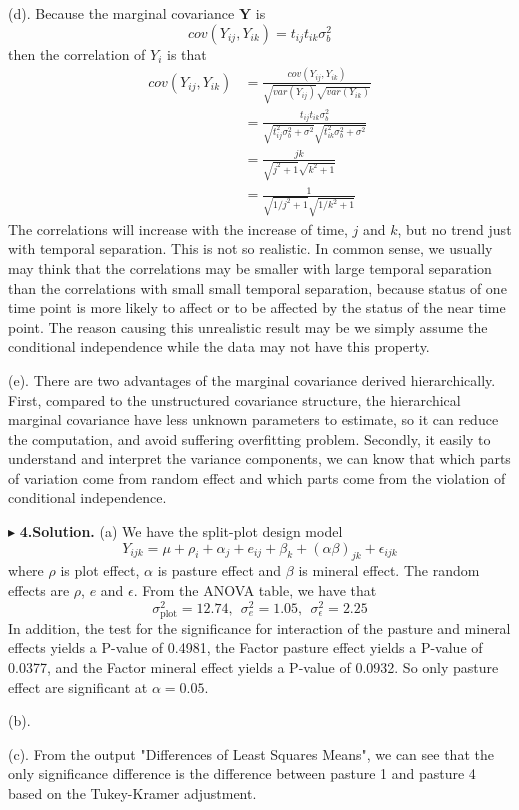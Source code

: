 \documentclass[letterpaper, 12pt]{article}
\newcommand{\ba}{$$\begin{aligned}}
\newcommand{\ea}{\end{aligned}$$}
\begin{document}
(d). Because the marginal covariance $\bm{Y}$ is
$$
cov(Y_{ij},Y_{ik})=t_{ij}t_{ik}\sigma_b^2
$$
then the correlation of $Y_i$ is that 
\ba
cov(Y_{ij},Y_{ik})&=\frac{cov(Y_{ij},Y_{ik})}{\sqrt{var(Y_{ij})}\sqrt{var(Y_{ik})}}\\
&=\frac{t_{ij}t_{ik}\sigma_b^2}{\sqrt{t_{ij}^2\sigma_b^2+\sigma^2}\sqrt{t_{ik}^2\sigma_b^2+\sigma^2}}\\
&=\frac{jk}{\sqrt{j^2+1}\sqrt{k^2+1}}\\
&=\frac{1}{\sqrt{1/j^2+1}\sqrt{1/k^2+1}}
\ea
The correlations will increase with the increase of time, $j$ and $k$, but no trend just with temporal separation. This is not so realistic. In common sense, we usually may think that the correlations may be smaller with large temporal separation than the correlations with small small temporal separation, because status of one time point is more likely to affect or to be affected by the status of the near time point. The reason causing this unrealistic result may be we simply assume the conditional independence while the data may not have this property.

(e). There are two advantages of the marginal covariance derived hierarchically. First, compared to the unstructured covariance structure, the hierarchical marginal covariance have less unknown parameters to estimate, so it can reduce the computation, and avoid suffering overfitting problem. Secondly, it easily to understand and interpret the variance components, we can know that which parts of variation come from random effect and which parts come from the violation of conditional independence.




$\blacktriangleright$ \textbf{4.\quad Solution.} 
(a) We have the split-plot design model
$$
Y_{ijk}=\mu+\rho_i+\alpha_j+e_{ij}+\beta_k+(\alpha\beta)_{jk}+\epsilon_{ijk}
$$
where $\rho$ is plot effect, $\alpha$ is pasture effect and $\beta$ is mineral effect. The random effects are $\rho$, $e$ and $\epsilon$. From the ANOVA table, we have that
$$
\sigma_{\text{plot}}^2=12.74,\ \ \sigma^2_{e}=1.05,\ \ \sigma_\epsilon^2=2.25
$$
In addition, the test for the significance for interaction of the pasture and mineral effects yields a P-value of 0.4981, the Factor pasture effect yields a P-value of 0.0377, and the Factor mineral effect yields a P-value of 0.0932. So only pasture effect are significant at $\alpha=0.05$.

(b).




(c). From the output "Differences of Least Squares Means", we can see that the only significance difference is the difference between pasture 1 and pasture 4 based on the Tukey-Kramer adjustment.
\end{document}
